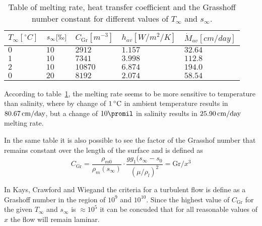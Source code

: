 	\begin{table}
	  \centering
	  \begin{tabular}{lllll}
	    $T_\infty [\unit{^\circ C}]$ & $s_\infty [\permil]$ & $C_{\text{Gr}} [\unit{m^{-3}}]$ & $h_{av} [\unit{W/m^2/K}]$ & $\dot{M}_{av} [\unit{cm/day}]$ \\
	    \hline
	    $0$ & $10$ & $2912$ & $1.157$ & $32.64$ \\
	    $1$ & $10$ & $7341$ & $3.998$ & $112.8$ \\
	    $2$ & $10$ & $10870$ & $6.874$ & $194.0$ \\
	    $0$ & $20$ & $8192$ & $2.074$ & $58.54$ \\
	    \hline
	  \end{tabular}
	  \caption{Table of melting rate, heat transfer coefficient and the Grasshoff number constant for different values of $T_\infty$ and $s_\infty$.}
	  \label{tab:thermRes}
	\end{table}

	According to table~\ref{tab:thermRes}, the melting rate seems to be more sensitive to temperature than salinity, where by change of $ \unit[1]{^\circ C}$ in ambient temperature results in $\unit[80.67]{cm/day}$, but a change of $10 \promil$ in salinity results in $\unit[25.90]{cm/day}$ melting rate.

	In the same table it is also possible to see the factor of the Grasshof number that remains constant over the length of the surface and is defined as
	\begin{equation*}
	  C_{\text{Gr}}= \frac{\rho_{m0}}{\rho_{m}(s_{\infty})}\cdot \frac{g g_1 (s_{\infty}-s_0}{(\mu/\rho_l)^2} = \text{Gr}/x^3
	\end{equation*}

	In Kays, Crawford and Wiegand the criteria for a turbulent flow is define as a Grashoff number in the region of $10^9$ and $10^10$. Since the highest value of $C_{\text{Gr}}$ for the given $T_{\infty}$ and $s_{\infty}$ is $\approx 10^5$ it can be concuded that for all reasonable values of $x$ the flow will remain laminar.




